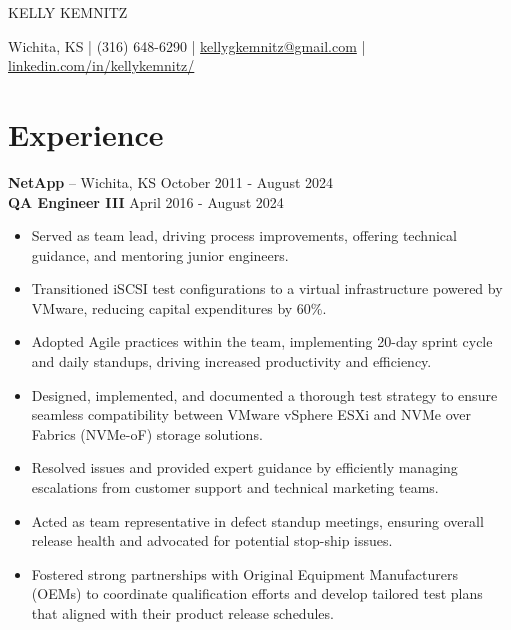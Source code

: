 \documentclass[11pt]{article}       %
\begin{document}
\centerline{\Huge KELLY KEMNITZ}

\vspace{5pt}

\centerline{Wichita, KS | (316) 648-6290 | \href{mailto:kellygkemnitz@gmail.com}{kellygkemnitz@gmail.com} | \href{https://www.linkedin.com/in/kellykemnitz/}{linkedin.com/in/kellykemnitz/}}

\vspace{-10pt}

\section*{Experience}
\textbf{NetApp} -- Wichita, KS \hfill October 2011 - August 2024 \\

\textbf{QA Engineer III} \hfill April 2016 - August 2024 \\
\vspace{-9pt}
\begin{itemize}
  \item Served as team lead, driving process improvements, offering technical guidance, and mentoring junior engineers.
  \item Transitioned iSCSI test configurations to a virtual infrastructure powered by VMware, reducing capital expenditures by 60\%.
  \item Adopted Agile practices within the team, implementing 20-day sprint cycle and daily standups, driving increased productivity and efficiency.
  \item Designed, implemented, and documented a thorough test strategy to ensure seamless compatibility between VMware vSphere ESXi and NVMe over Fabrics (NVMe-oF) storage solutions.
  \item Resolved issues and provided expert guidance by efficiently managing escalations from customer support and technical marketing teams.
  \item Acted as team representative in defect standup meetings, ensuring overall release health and advocated for potential stop-ship issues.
  \item Fostered strong partnerships with Original Equipment Manufacturers (OEMs) to coordinate qualification efforts and develop tailored test plans that aligned with their product release schedules.
\end{itemize}
\end{document}
